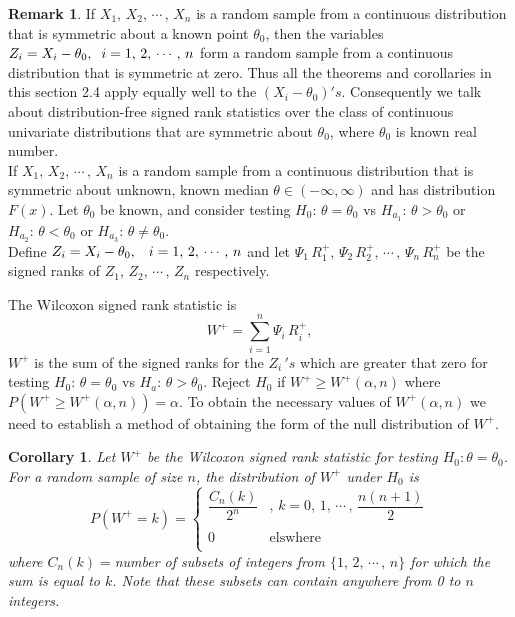 \documentclass[12pt,a4paper]{report}
\theoremstyle{definition}
\newtheorem{remark}[thm]{Remark}
\theoremstyle{plain}
\newtheorem{coro}[thm]{Corollary}
\begin{document}
\begin{remark}
If $X_1, \, X_2, \, \cdots\, , \, X_n$ is  a random sample from a continuous distribution that is symmetric about a known point $\theta_0$, then the variables $Z_i = X_i - \theta_0, \hspace{0.2cm} i = 1, \, 2, \, \cdots\, , \, n$ form a random sample from a  continuous distribution that is symmetric at zero. Thus all the theorems and corollaries in this section 2.4 apply equally well to the $(X_i - \theta_0)'s$. Consequently we talk about distribution-free signed rank statistics over the class of continuous univariate distributions  that are symmetric about $\theta_0$, where $\theta_0$ is known real number.\\ 
If $X_1, \, X_2, \,\cdots\, , \, X_n$ is a random sample from a continuous distribution that is symmetric about unknown, known median $\theta\in (-\infty,\infty)$ and has distribution $F(x)$. Let $\theta_0$ be known, and consider testing $H_0:\, \theta = \theta_0$ vs $H_{a_1}:\, \theta > \theta_0$ or $H_{a_2}:\, \theta < \theta_0$ or $H_{a_3}:\, \theta \neq \theta_0$.\\
Define $Z_i = X_i - \theta_0, \hspace{0.3cm} i = 1, \, 2, \, \cdots\, , \, n$ and let $\Psi_1\, R^+_1, \, \Psi_2\, R^+_2, \, \cdots\, , \, \Psi_n\, R^+_n$ be the signed ranks of $Z_1, \, Z_2, \, \cdots\, , \, Z_n$ respectively.\\
\end{remark}

The Wilcoxon signed rank statistic is $$W^+  = \sum^n_{i = 1} \Psi_i\, R^+_i, $$
$W^+$ is the sum of the signed ranks for the $Z_i\, 's$ which are greater that zero for testing  $H_0:\, \theta = \theta_0$ vs $H_a:\, \theta > \theta_0$. Reject $H_0$ if $W^+ \geq W^+(\alpha, n)$ where $P\left(W^+\geq W^+(\alpha, n)\right) = \alpha$.
To obtain the necessary values of $W^+(\alpha,n)$ we need to establish a method of obtaining the form of the  null distribution of $W^+$.


\begin{coro}
Let $W^+$ be the Wilcoxon signed rank statistic for testing $H_0: \theta = \theta_0$. For a random sample of size $n$, the distribution of $W^+$ under $H_0$ is 
$$P(W^+ = k) = \begin{cases}
\dfrac{C_n(k)}{2^n} & , \, k = 0, \, 1, \, \cdots\, , \, \dfrac{n(n+1)}{2}\\\\
0 & \text{elswhere}\\
\end{cases}$$
where $C_n(k) = $number of subsets of integers from $\{1, \, 2, \, \cdots\, , \, n\}$ for which the sum is equal to $k$. Note that these subsets can contain anywhere from 0 to $n$ integers.
\end{coro}
\end{document}
